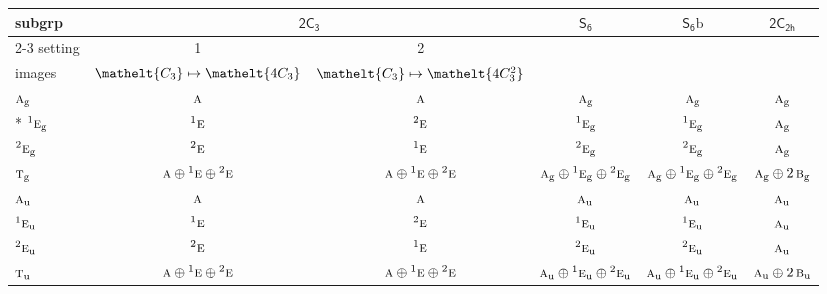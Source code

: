 \documentclass[10pt,a4paper]{article}
\numberwithin{equation}{section}
\newcommand{\eltfont}[1]{{\let\sigma\eltsigma\mathelt{#1}}}
\newcommand{\grp}[1]{\mathsf{#1}}
\newcommand{\irr}[1]{\text{\normalfont\scshape #1}}
\newcommand{\conjpair}[1]{{}^{#1}}
\newcommand{\cls}[1]{\eltfont{#1}}
\newcommand{\ptag}[1]{\mathrm{#1}}
\newcommand{\secondclass}{\mathrm{b}}
\begin{document}
{\small\begin{longtable}{@{}lccccc@{}}\toprule
subgrp & \multicolumn{2}{c}{\href{2C3.pdf}{$\grp{2C_{3}}$}} & \href{S6.pdf}{$\grp{S_{6}}$} & \href{S6b.pdf}{$\grp{S_{6}}\secondclass$} & \href{2C2h.pdf}{$\grp{2C_{2h}}$}\\\cmidrule(lr){2-3}
setting & 1 & 2 &  &  & \\
images & {\scriptsize $\cls{C_{3}} \mapsto \cls{4C_{3}}$} & {\scriptsize $\cls{C_{3}} \mapsto \cls{4C_{3}^{2}}$} &  &  & \\\midrule\endhead
\bottomrule\endfoot\endlastfoot
$\irr{a}_{\ptag{g}}$ & $\irr{a}$ & $\irr{a}$ & $\irr{a}_{\ptag{g}}$ & $\irr{a}_{\ptag{g}}$ & $\irr{a}_{\ptag{g}}$\\*
$\conjpair{1}\irr{e}_{\ptag{g}}$ & $\conjpair{1}\irr{e}$ & $\conjpair{2}\irr{e}$ & $\conjpair{1}\irr{e}_{\ptag{g}}$ & $\conjpair{1}\irr{e}_{\ptag{g}}$ & $\irr{a}_{\ptag{g}}$\\
$\conjpair{2}\irr{e}_{\ptag{g}}$ & $\conjpair{2}\irr{e}$ & $\conjpair{1}\irr{e}$ & $\conjpair{2}\irr{e}_{\ptag{g}}$ & $\conjpair{2}\irr{e}_{\ptag{g}}$ & $\irr{a}_{\ptag{g}}$\\
$\irr{t}_{\ptag{g}}$ & $\irr{a}\oplus \conjpair{1}\irr{e}\oplus \conjpair{2}\irr{e}$ & $\irr{a}\oplus \conjpair{1}\irr{e}\oplus \conjpair{2}\irr{e}$ & $\irr{a}_{\ptag{g}}\oplus \conjpair{1}\irr{e}_{\ptag{g}}\oplus \conjpair{2}\irr{e}_{\ptag{g}}$ & $\irr{a}_{\ptag{g}}\oplus \conjpair{1}\irr{e}_{\ptag{g}}\oplus \conjpair{2}\irr{e}_{\ptag{g}}$ & $\irr{a}_{\ptag{g}}\oplus 2\,\irr{b}_{\ptag{g}}$\\
$\irr{a}_{\ptag{u}}$ & $\irr{a}$ & $\irr{a}$ & $\irr{a}_{\ptag{u}}$ & $\irr{a}_{\ptag{u}}$ & $\irr{a}_{\ptag{u}}$\\
$\conjpair{1}\irr{e}_{\ptag{u}}$ & $\conjpair{1}\irr{e}$ & $\conjpair{2}\irr{e}$ & $\conjpair{1}\irr{e}_{\ptag{u}}$ & $\conjpair{1}\irr{e}_{\ptag{u}}$ & $\irr{a}_{\ptag{u}}$\\
$\conjpair{2}\irr{e}_{\ptag{u}}$ & $\conjpair{2}\irr{e}$ & $\conjpair{1}\irr{e}$ & $\conjpair{2}\irr{e}_{\ptag{u}}$ & $\conjpair{2}\irr{e}_{\ptag{u}}$ & $\irr{a}_{\ptag{u}}$\\
$\irr{t}_{\ptag{u}}$ & $\irr{a}\oplus \conjpair{1}\irr{e}\oplus \conjpair{2}\irr{e}$ & $\irr{a}\oplus \conjpair{1}\irr{e}\oplus \conjpair{2}\irr{e}$ & $\irr{a}_{\ptag{u}}\oplus \conjpair{1}\irr{e}_{\ptag{u}}\oplus \conjpair{2}\irr{e}_{\ptag{u}}$ & $\irr{a}_{\ptag{u}}\oplus \conjpair{1}\irr{e}_{\ptag{u}}\oplus \conjpair{2}\irr{e}_{\ptag{u}}$ & $\irr{a}_{\ptag{u}}\oplus 2\,\irr{b}_{\ptag{u}}$\\

\end{longtable}}
\end{document}
